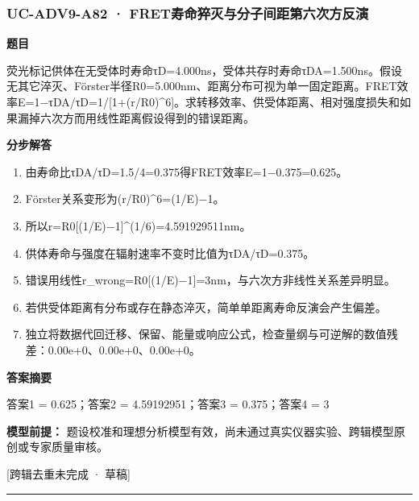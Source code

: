 \documentclass[UTF8,11pt,a4paper]{ctexart}
\begin{document}
\subsubsection*{UC-ADV9-A82 · FRET寿命猝灭与分子间距第六次方反演}
\noindent\textbf{题目}\par
荧光标记供体在无受体时寿命τD=4.000ns，受体共存时寿命τDA=1.500ns。假设无其它淬灭、Förster半径R0=5.000nm、距离分布可视为单一固定距离。FRET效率E=1−τDA/τD=1/[1+(r/R0)\textasciicircum{}6]。求转移效率、供受体距离、相对强度损失和如果漏掉六次方而用线性距离假设得到的错误距离。\par
\medskip\noindent\textbf{分步解答}
\begin{enumerate}
\item 由寿命比τDA/τD=1.5/4=0.375得FRET效率E=1−0.375=0.625。
\item Förster关系变形为(r/R0)\textasciicircum{}6=(1/E)−1。
\item 所以r=R0[(1/E)−1]\textasciicircum{}(1/6)=4.591929511nm。
\item 供体寿命与强度在辐射速率不变时比值为τDA/τD=0.375。
\item 错误用线性r\_wrong=R0[(1/E)−1]=3nm，与六次方非线性关系差异明显。
\item 若供受体距离有分布或存在静态淬灭，简单单距离寿命反演会产生偏差。
\item 独立将数据代回迁移、保留、能量或响应公式，检查量纲与可逆解的数值残差：0.00e+0、0.00e+0、0.00e+0。
\end{enumerate}
\noindent\textbf{答案摘要}\par
答案1 = 0.625；答案2 = 4.59192951；答案3 = 0.375；答案4 = 3\par
\noindent\textbf{模型前提：}
题设校准和理想分析模型有效，尚未通过真实仪器实验、跨辑模型原创或专家质量审核。\par
\noindent\textcolor{red!65!black}{[跨辑去重未完成 · 草稿]} \par
\medskip\hrule\medskip
{}
\end{document}

